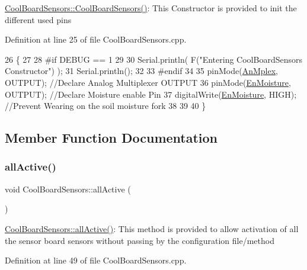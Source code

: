 \hyperlink{class_cool_board_sensors_a91ff2a02f5486f90cf2413a1cf8a9ed4}{Cool\+Board\+Sensors\+::\+Cool\+Board\+Sensors()}\+: This Constructor is provided to init the different used pins 

Definition at line 25 of file Cool\+Board\+Sensors.\+cpp.


\begin{DoxyCode}
26 \{
27 
28 \textcolor{preprocessor}{#if DEBUG == 1}
29 
30     Serial.println( F(\textcolor{stringliteral}{"Entering CoolBoardSensors Constructor"}) );
31     Serial.println();
32 
33 \textcolor{preprocessor}{#endif}
34     
35     pinMode(\hyperlink{class_cool_board_sensors_a12ef28b1046219e0aee10bf64e28c4a5}{AnMplex}, OUTPUT);                \textcolor{comment}{//Declare Analog Multiplexer OUTPUT}
36     pinMode(\hyperlink{class_cool_board_sensors_a6177d02e14a057a2f171a2e930b5038d}{EnMoisture}, OUTPUT);             \textcolor{comment}{//Declare Moisture enable Pin}
37     digitalWrite(\hyperlink{class_cool_board_sensors_a6177d02e14a057a2f171a2e930b5038d}{EnMoisture}, HIGH);            \textcolor{comment}{//Prevent Wearing on the soil moisture fork}
38 
39 
40 \}
\end{DoxyCode}


\subsection{Member Function Documentation}
\mbox{\label{class_cool_board_sensors_aa432c5aac88f89c31a10766390f23e0b}} 
\subsubsection{\texorpdfstring{all\+Active()}{allActive()}}
{\footnotesize\ttfamily void Cool\+Board\+Sensors\+::all\+Active (\begin{DoxyParamCaption}{ }\end{DoxyParamCaption})}

\hyperlink{class_cool_board_sensors_aa432c5aac88f89c31a10766390f23e0b}{Cool\+Board\+Sensors\+::all\+Active()}\+: This method is provided to allow activation of all the sensor board sensors without passing by the configuration file/method 

Definition at line 49 of file Cool\+Board\+Sensors.\+cpp.


